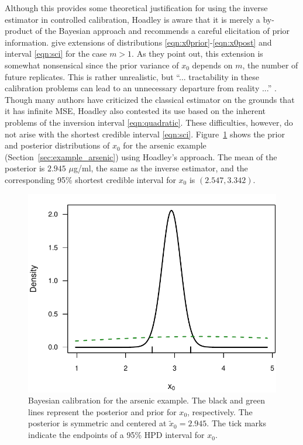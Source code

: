 \documentclass[cmfont,usenames,dvipsnames,leqno]{afit-etd}\usepackage[]{graphicx}\usepackage[]{color}
\makeatletter
\def\maxwidth{ %
  \ifdim\Gin@nat@width>\linewidth
    \linewidth
  \else
    \Gin@nat@width
  \fi
}
\newenvironment{knitrout}{}{} %
\renewenvironment{knitrout}{\begin{singlespace}}{\end{singlespace}}
\newcommand{\wt}[1]{\ensuremath{\widetilde{#1}}}
\makeatother
\begin{document}
Although this provides some theoretical justification for using the inverse estimator in controlled calibration, Hoadley is aware that it is merely a by-product of the Bayesian approach and recommends a careful elicitation of prior information. \citet[pp. 198, 204]{aitchison_statistical_1980} give extensions of distributions \eqref{eqn:x0prior}-\eqref{eqn:x0post} and interval \eqref{eqn:sci} for the case $m > 1$. As they point out, this extension is somewhat nonsensical since the prior variance of $x_0$ depends on $m$, the number of future replicates. This is rather unrealistic, but ``... tractability in these calibration problems can lead to an unnecessary departure from reality ...'' \citep[pp. 198]{aitchison_statistical_1980}. Though many authors have criticized the classical estimator on the grounds that it has infinite MSE, Hoadley also contested its use based on the inherent problems of the inversion interval \eqref{eqn:quadratic}. These difficulties, however, do not arise with the shortest credible interval \eqref{eqn:sci}. Figure~\ref{fig:arsenic-bayes} shows the prior and posterior distributions of $x_0$ for the arsenic example (Section~\ref{sec:example_arsenic}) using Hoadley's approach. The mean of the posterior is $2.945$ $\mu$g/ml, the same as the inverse estimator, and the corresponding 95\% shortest credible interval for $x_0$ is $(2.547, 3.342)$.  

\begin{knitrout}
\color{fgcolor}\begin{figure}[H]

\includegraphics[width=\maxwidth]{figure/arsenic-bayes} \caption[Bayesian calibration for the arsenic example]{Bayesian calibration for the arsenic example. The black and green lines represent the posterior and prior for $x_0$, respectively. The posterior is symmetric and centered at $\wt{x}_0 = 2.945$. The tick marks indicate the endpoints of a 95\% HPD interval for $x_0$.\label{fig:arsenic-bayes}}
\end{figure}


\end{knitrout}
\end{document}
